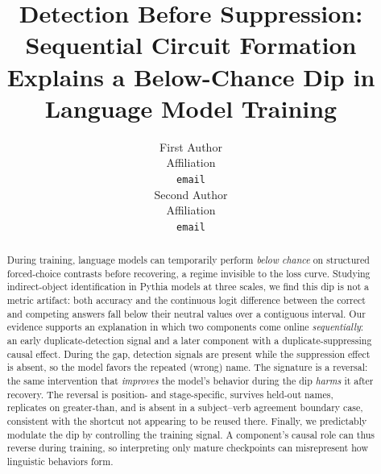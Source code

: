 \documentclass[11pt]{article}
\title{Detection Before Suppression: Sequential Circuit Formation\\
Explains a Below-Chance Dip in Language Model Training}
\author{First Author \\ Affiliation \\ \texttt{email} \\\And
        Second Author \\ Affiliation \\ \texttt{email} \\}
\begin{document}
\maketitle

\begin{abstract}
During training, language models can temporarily perform \emph{below chance} on
structured forced-choice contrasts before recovering, a regime invisible to the loss curve.
Studying indirect-object identification in Pythia models at three scales, we
find this dip is not a metric artifact: both accuracy and the continuous logit
difference between the correct and competing answers fall below their neutral
values over a contiguous interval. Our evidence supports an explanation in which
two components come online \emph{sequentially}: an early duplicate-detection
signal and a later component with a duplicate-suppressing causal effect.
During the gap, detection signals are present while the suppression effect is
absent, so the model favors the repeated (wrong) name. The signature is a
reversal: the same intervention that \emph{improves} the model's behavior during
the dip \emph{harms} it after recovery. The reversal is position- and
stage-specific, survives held-out names, replicates on greater-than, and is
absent in a subject--verb agreement boundary case, consistent with the shortcut
not appearing to be reused there. Finally, we predictably modulate the dip
by controlling the training signal. A component's causal role can
thus reverse during training, so interpreting only mature checkpoints can
misrepresent how linguistic behaviors form.
\end{abstract}

\end{document}
